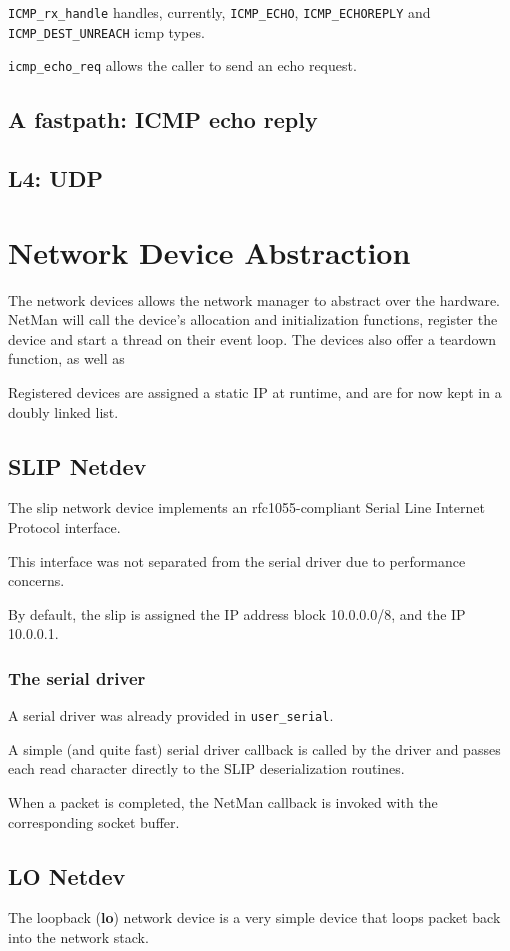\documentclass[a4paper,twoside,openright]{report}
\renewcommand{\t}[1]{%
	{\texttt{#1}}}
\begin{document}
\t{ICMP\_rx\_handle} handles, currently, \t{ICMP\_ECHO}, \t{ICMP\_ECHOREPLY} and \t{ICMP\_DEST\_UNREACH} icmp types.

\t{icmp\_echo\_req} allows the caller to send an echo request.

\subsection{A fastpath: ICMP echo reply}

\subsection{L4: UDP}

\section{Network Device Abstraction}
The network devices allows the network manager to abstract over the hardware. NetMan will call the device's allocation and initialization functions, register the device and start a thread on their event loop.
The devices also offer a teardown function, as well as 

Registered devices are assigned a static IP at runtime, and are for now kept in a doubly linked list.


\subsection{SLIP Netdev}
The slip network device implements an rfc1055-compliant Serial Line Internet Protocol interface.

This interface was not separated from the serial driver due to performance concerns.

By default, the slip is assigned the IP address block 10.0.0.0/8, and the IP 10.0.0.1.

\subsubsection{The serial driver}
A serial driver was already provided in \t{user\_serial}. 

A simple (and quite fast) serial driver callback is called by the driver and passes each read character directly to the SLIP deserialization routines.

When a packet is completed, the NetMan callback is invoked with the corresponding socket buffer.

\subsection{LO Netdev}
The loopback (\textbf{lo}) network device is a very simple device that loops packet back into the network stack.
\end{document}
